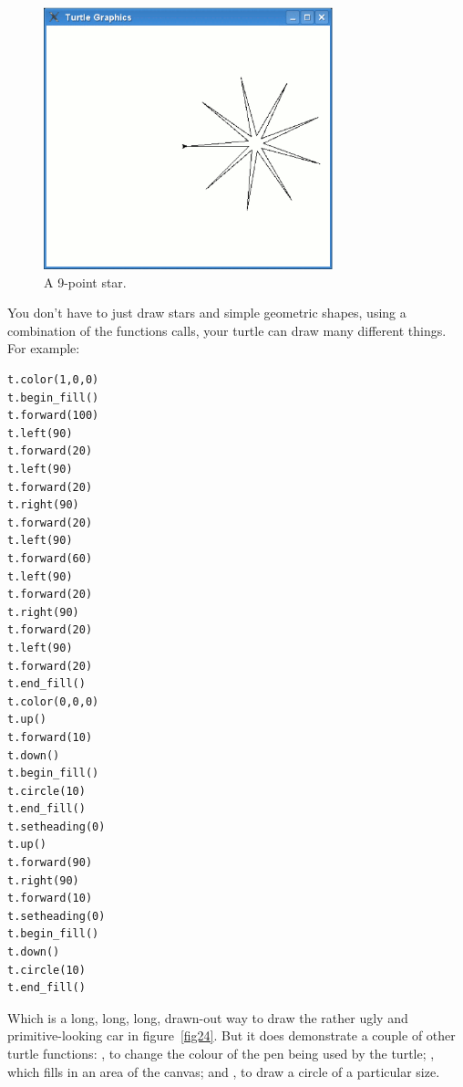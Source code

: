 \begin{figure}
\begin{center}
\includegraphics[width=84mm]{eps/figure23.eps}
\end{center}
\caption{A 9-point star.}\label{fig23}
\end{figure}

You don't have to just draw stars and simple geometric shapes, using a combination of the functions calls, your turtle can draw many different things.  For example:

\begin{listing}
\begin{verbatim}
t.color(1,0,0)
t.begin_fill()
t.forward(100)
t.left(90)
t.forward(20)
t.left(90)
t.forward(20)
t.right(90)
t.forward(20)
t.left(90)
t.forward(60)
t.left(90)
t.forward(20)
t.right(90)
t.forward(20)
t.left(90)
t.forward(20)
t.end_fill()
t.color(0,0,0)
t.up()
t.forward(10)
t.down()
t.begin_fill()
t.circle(10)
t.end_fill()
t.setheading(0)
t.up()
t.forward(90)
t.right(90)
t.forward(10)
t.setheading(0)
t.begin_fill()
t.down()
t.circle(10)
t.end_fill()
\end{verbatim}
\end{listing}

\noindent
Which is a long, long, long, drawn-out way to draw the rather ugly and primitive-looking car in figure~\ref{fig24}. But it does demonstrate a couple of other turtle functions:  , to change the colour of the pen being used by the turtle; , which fills in an area of the canvas; and , to draw a circle of a particular size.


